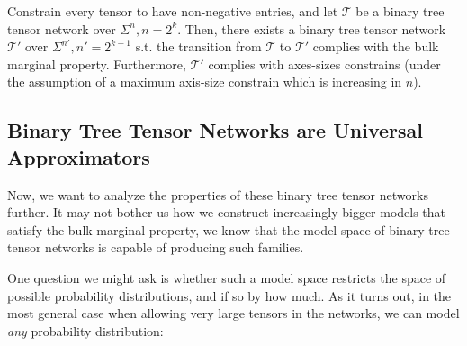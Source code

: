 \documentclass[../../main.tex]{subfiles}
\begin{document}
    \begin{corollary}
        Constrain every tensor to have non-negative entries, and let $\mathcal{T}$ be a binary tree tensor network over $\Sigma^n, n = 2^k$. Then, there exists a binary tree tensor network $\mathcal{T}'$ over $\Sigma^{n'}, n' = 2^{k+1}$ s.t. the transition from $\mathcal{T}$ to $\mathcal{T}'$ complies with the bulk marginal property. Furthermore, $\mathcal{T}'$ complies with axes-sizes constrains (under the assumption of a maximum axis-size constrain which is increasing in $n$).
    \end{corollary}

\subsection{Binary Tree Tensor Networks are Universal Approximators}
    Now, we want to analyze the properties of these binary tree tensor networks further. It may not bother us how we construct increasingly bigger models that satisfy the bulk marginal property, we know that the model space of binary tree tensor networks is capable of producing such families.

    One question we might ask is whether such a model space restricts the space of possible probability distributions, and if so by how much. As it turns out, in the most general case when allowing very large tensors in the networks, we can model \emph{any} probability distribution:
\end{document}
